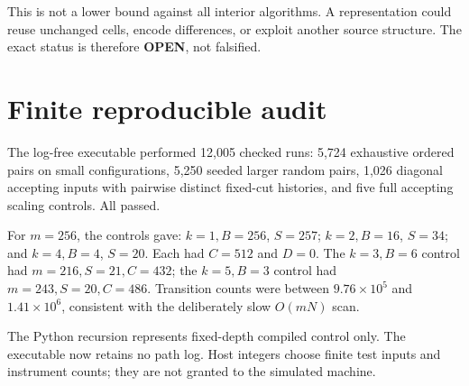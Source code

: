 \documentclass[11pt]{article}
\begin{document}
This is not a lower bound against all interior algorithms.  A representation
could reuse unchanged cells, encode differences, or exploit another source
structure.  The exact status is therefore \textbf{OPEN}, not falsified.

\section{Finite reproducible audit}
The log-free executable performed 12,005 checked runs: 5,724 exhaustive
ordered pairs on small configurations, 5,250 seeded larger random pairs,
1,026 diagonal accepting inputs with pairwise distinct fixed-cut histories,
and five full accepting scaling controls.  All passed.

For $m=256$, the controls gave: $k=1,B=256$, $S=257$; $k=2,B=16$,
$S=34$; and $k=4,B=4$, $S=20$.  Each had $C=512$ and $D=0$.  The
$k=3,B=6$ control had $m=216,S=21,C=432$; the $k=5,B=3$ control had
$m=243,S=20,C=486$.  Transition counts were between $9.76\times10^5$ and
$1.41\times10^6$, consistent with the deliberately slow $O(mN)$ scan.

The Python recursion represents fixed-depth compiled control only.  The
executable now retains no path log.  Host integers choose finite test inputs
and instrument counts; they are not granted to the simulated machine.
\end{document}

